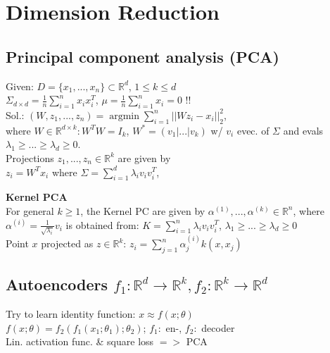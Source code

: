 \section*{Dimension Reduction}
\subsection*{Principal component analysis (PCA)}
Given: $D=\{x_1,...,x_n\} \subset \mathbb{R}^d$, $1\leq k \leq d$\\
$\Sigma_{d \times d} = \frac{1}{n}\sum_{i=1}^n x_i x_i^T$, $\mu =\frac{1}{n}\sum_{i = 1}^n x_i = 0$ !!\\
Sol.:
$(W,z_1,...,z_n) = \operatorname{argmin} \sum_{i=1}^n||W z_i - x_i||_2^2$,\\
where $W \in \mathbb{R}^{d \times k}: W^TW = I_k$, $W^* = (v_1|...|v_k)$ w/ $v_i$ evec. of $\Sigma$ and evals $\lambda_1 \geq ... \geq \lambda_d \geq 0$.\\
Projections $z_1,...,z_n\in\mathbb{R}^k$ are given by\\
$z_i = W^T x_i$ where $\Sigma = \sum_{i=1}^d \lambda_i v_i v_i^T$, 

\textbf{Kernel PCA}\\
For general $k\geq1$, the Kernel PC are given by $\alpha^{(1)},...,\alpha^{(k)}\in \mathbb{R}^n$, where $\alpha^{(i)} = \frac{1}{\sqrt{\lambda_i}}v_i$ is obtained from: $K = \sum_{i=1}^n \lambda_i v_i v_i^T$, $\lambda_1 \geq ... \geq \lambda_d \geq 0$\\
Point $x$ projected as $z \in \mathbb{R}^k$:
$z_i = \sum_{j=1}^n\alpha_j^{(i)}k(x,x_j)$

\subsection*{Autoencoders $f_1: \mathbb{R}^d \rightarrow \mathbb{R}^k, f_2:\mathbb{R}^k \rightarrow \mathbb{R}^d$}
Try to learn identity function: $x \approx f(x;\theta)$\\
$f(x;\theta) = f_2(f_1(x_1;\theta_1);\theta_2)$; $f_1:$ en-, $f_2:$ decoder\\
Lin. activation func. \& square loss $=>$ PCA
